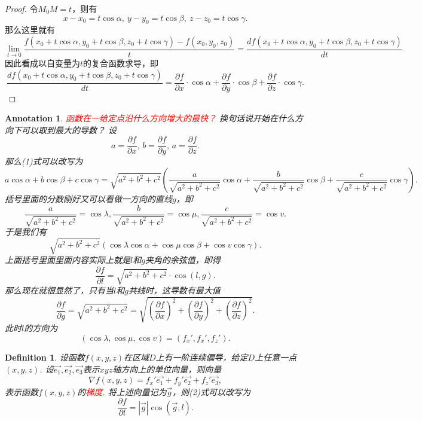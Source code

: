\documentclass{article}
\newtheorem{definition}[theorem]{Definition}
\newtheorem{annotation}[theorem]{Annotation}
\newcommand{\redt}[1]{\textcolor{red}{#1}}
\begin{document}
\begin{proof}
\rm 令$M_0M=t$，则有
$$
x-x_0 = t\cos \alpha, ~y-y_0 = t\cos \beta , ~z-z_0 = t\cos\gamma.
$$
那么这里就有
$$
\lim\limits_{t \to 0} \frac{f(x_0+t\cos\alpha,y_0+t\cos\beta, z_0 + t\cos\gamma)-f(x_0,y_0,z_0)}{t} = \frac{df(x_0+t\cos\alpha,y_0+t\cos\beta, z_0 + t\cos\gamma)}{dt}
$$
因此看成以自变量为$t$的复合函数求导，即
$$
\frac{df(x_0+t\cos\alpha,y_0+t\cos\beta, z_0 + t\cos\gamma)}{dt} = \frac{\partial f}{\partial x}\cdot\cos \alpha + \frac{\partial f}{\partial y}\cdot\cos \beta + \frac{\partial f}{\partial z}\cdot\cos \gamma. 
$$
\end{proof}

\begin{annotation}
\rm \redt{函数在一给定点沿什么方向增大的最快？} 换句话说开始在什么方向下可以取到最大的导数？ 设
$$
a = \frac{\partial f}{\partial x},\,b = \frac{\partial f}{\partial y},\,a = \frac{\partial f}{\partial z}.
$$ 
那么(1)式可以改写为
$$
a\cos\alpha + b\cos\beta + c\cos\gamma  = \sqrt{a^2+b^2+c^2}\left(\frac{a}{\sqrt{a^2+b^2+c^2}}\cos\alpha + \frac{b}{\sqrt{a^2+b^2+c^2}}\cos\beta + \frac{c}{\sqrt{a^2+b^2+c^2}}\cos\gamma \right). 
$$
括号里面的分数刚好又可以看做一方向的直线$g$，即
$$
\frac{a}{\sqrt{a^2+b^2+c^2}} = \cos \lambda, \frac{b}{\sqrt{a^2+b^2+c^2}} = \cos \mu,
\frac{c}{\sqrt{a^2+b^2+c^2}} = \cos v.
$$
于是我们有
$$
\sqrt{a^2+b^2+c^2}(\cos\lambda\cos\alpha+\cos\mu\cos\beta+\cos v\cos\gamma).
$$
上面括号里面里面内容实际上就是$l$和$g$夹角的余弦值，即得
\begin{equation}
\frac{\partial f}{\partial l} = \sqrt{a^2+b^2+c^2}\cdot \cos(l,g).
\end{equation}
那么现在就很显然了，只有当$l$和$g$共线时，这导数有最大值
$$
\frac{\partial f}{\partial g} = \sqrt{a^2+b^2+c^2} = \sqrt{\left(\frac{\partial f}{\partial x}\right)^2 +\left(\frac{\partial f}{\partial y}\right)^2  + \left(\frac{\partial f}{\partial z}\right)^2 }.
$$
此时$l$的方向为
$$
(\cos \lambda, \cos \mu,\cos v) = (f_x', f_x', f_z'). 
$$
\end{annotation}

\begin{definition}
\rm 设函数$f(x,y,z)$在区域$D$上有一阶连续偏导，给定$D$上任意一点$(x,y,z)$. 设$\vec{e_1},\vec{e_2},\vec{e_3}$表示$xyz$轴方向上的单位向量，则向量
$$
\nabla f(x,y,z) =  f_x'\vec{e_1} + f_y' \vec{e_2} +f_z'\vec{e_3},
$$
表示函数$f(x,y,z)$的\redt{梯度}. 将上述向量记为$\vec{g}$，则(2)式可以改写为
$$
\frac{\partial f}{\partial l} = |\vec{g}|\cos(\vec{g},l).
$$
\end{definition}
\end{document}
